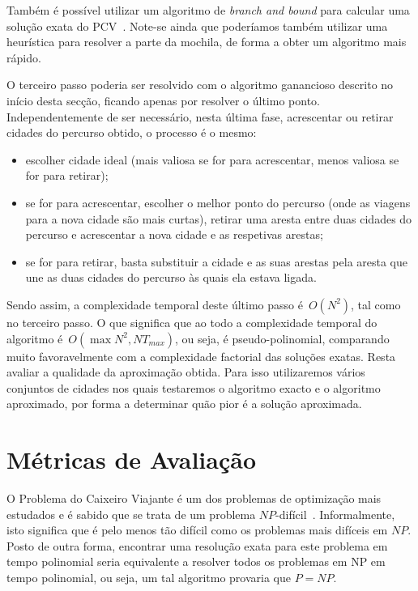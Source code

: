 \documentclass[12pt,a4paper,reqno]{report}
\numberwithin{figure}{section}
\numberwithin{equation}{section}
\begin{document}
Também é possível utilizar um algoritmo de \emph{branch and bound} para calcular uma solução exata do PCV~\cite{tube_bnb_tsp, Narahari:2000}. Note-se ainda que poderíamos também utilizar uma heurística para resolver a parte da mochila, de forma a obter um algoritmo mais rápido.

O terceiro passo poderia ser resolvido com o algoritmo ganancioso descrito no início desta secção, ficando apenas por resolver o último ponto. Independentemente de ser necessário, nesta última fase, acrescentar ou retirar cidades do percurso obtido, o processo é o mesmo:
\begin{itemize}
	\item escolher cidade ideal (mais valiosa se for para acrescentar, menos valiosa se for para retirar);
	\item se for para acrescentar, escolher o melhor ponto do percurso (onde as viagens para a nova cidade são mais curtas), retirar uma aresta entre duas cidades do percurso e acrescentar a nova cidade e as respetivas arestas;
	\item se for para retirar, basta substituir a cidade e as suas arestas pela aresta que une as duas cidades do percurso às quais ela estava ligada.
\end{itemize}

Sendo assim, a complexidade temporal deste último passo é~$O(N^2)$, tal como no terceiro passo. O que significa que ao todo a complexidade temporal do algoritmo é~$O(\max{N^2,NT_{max}})$, ou seja, é pseudo-polinomial, comparando muito favoravelmente com a complexidade factorial das soluções exatas. Resta avaliar a qualidade da aproximação obtida. Para isso utilizaremos vários conjuntos de cidades nos quais testaremos o algoritmo exacto e o algoritmo aproximado, por forma a determinar quão pior é a solução aproximada.

\chapter{Métricas de Avaliação}

O Problema do Caixeiro Viajante é um dos problemas de optimização mais estudados e é sabido que se trata de um problema $NP$-difícil~\cite{Garey&Johnson:1979,Papadimitriou:1994}. Informalmente, isto significa que é pelo menos tão difícil como os problemas mais difíceis em $NP$. Posto de outra forma, encontrar uma resolução exata para este problema em tempo polinomial seria equivalente a resolver todos os problemas em NP em tempo polinomial, ou seja, um tal algoritmo provaria que $P = NP$.
\end{document}
